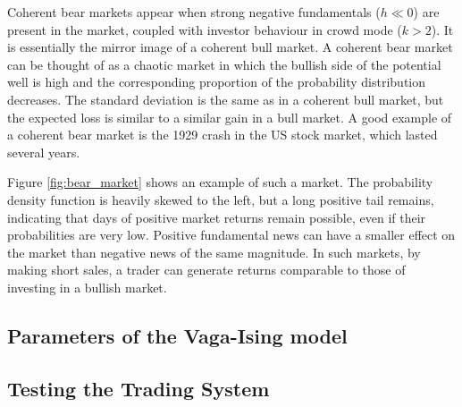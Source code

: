 Coherent bear markets appear when strong negative fundamentals ($h \ll 0$) are present in the market, coupled with investor behaviour in crowd mode ($k>2$). It is essentially the mirror image of a coherent bull market. A coherent bear market can be thought of as a chaotic market in which the bullish side of the potential well is high and the corresponding proportion of the probability distribution decreases. The standard deviation is the same as in a coherent bull market, but the expected loss is similar to a similar gain in a bull market. A good example of a coherent bear market is the 1929 crash in the US stock market, which lasted several years.


Figure \ref{fig:bear_market} shows an example of such a market. The probability density function is heavily skewed to the left, but a long positive tail remains, indicating that days of positive market returns remain possible, even if their probabilities are very low. Positive fundamental news can have a smaller effect on the market than negative news of the same magnitude. In such markets, by making short sales, a trader can generate returns comparable to those of investing in a bullish market.
 
\subsection{Parameters of the Vaga-Ising model}


 
\subsection{Testing the Trading System}
